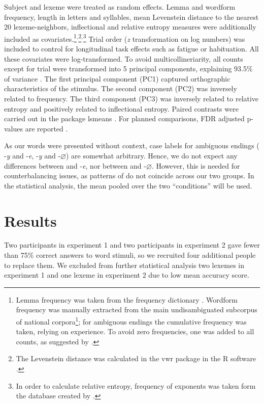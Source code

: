 \documentclass[output=paper, modfonts,newtxmath,hidelinks]{langscibook}
\begin{document}
Subject and lexeme were treated as random effects. Lemma and wordform frequency, length in letters and syllables, mean Levenstein distance to the nearest 20 lexeme-neighbors, 
inflectional and relative entropy measures were additionally included as covariates.\footnote{Lemma frequency was taken from the frequency dictionary \citep{lyashevskaya2009frequency}. Wordform frequency was manually extracted from the main undisambiguated subcorpus of  national corpora\footnote{\url{http://ruscorpora.ru}}; for ambiguous endings the cumulative frequency was taken,  relying on  experience. To avoid zero frequencies, one was added to all counts, as suggested by \citet*{brysbaert2013dealing}.}$^,$\footnote{The Levenstein distance was calculated in the vwr package \citep{keuleers2013vwr} in the R software \citep{team2014r}.}$^,$\footnote{In order to calculate relative entropy, frequency of exponents was taken form the database created by \citet*{samojlova2014frequencies}.} Trial order (\textit{z} transformation on log numbers) was included to control for longitudinal task effects such as fatigue or habituation. All these covariates were log-transformed. To avoid multicollineriarity, all counts except for trial were transformed into 5 principal components, explaining 93.5\% of variance \citep{baayen2008analyzing}. The first principal component (PC1) captured orthographic characteristics of the stimulus. The second component (PC2) was inversely related to frequency. The third component (PC3) was inversely related to relative entropy and positively related to inflectional entropy. Paired contrasts were carried out in the package lsmeans \citep{lenth2016least}. For planned comparisons, FDR adjusted p-values are reported \citep{benjamini1995controlling}. 

As our words were presented without context, case labels for ambiguous endings ( -\textit{y} and -\textit{e},  -\textit{y} and -\textit{$\varnothing$}) are somewhat arbitrary. Hence, we do not expect any differences between   and  -\textit{e}, nor between   and  -\textit{$\varnothing$}. However, this is needed for counterbalancing issues, as patterns of  do not coincide across our two  groups. In the statistical analysis, the mean pooled over the two ``conditions'' will be used.

\section{Results}
Two participants in experiment 1 and two participants in experiment 2 gave fewer than 75\% correct answers to word stimuli, so we recruited four additional people to replace them. We excluded from further  statistical analysis two lexemes in experiment 1 and one lexeme in experiment 2 due to low mean accuracy score.
\end{document}
